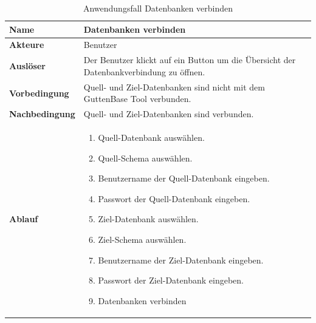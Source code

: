 	\begin{table}[H]
		\centering
		\begin{tabular}{ |p{4cm}|p{8cm}| }
			\hline
			\textbf{Name} & Datenbanken verbinden  \\
			\hline
			\textbf{Akteure} & Benutzer  \\
			\hline
			\textbf{Auslöser} & Der Benutzer klickt auf ein Button um die Übersicht der Datenbankverbindung zu öffnen. \\
			\hline
			\textbf{Vorbedingung} &  Quell- und Ziel-Datenbanken sind nicht mit dem GuttenBase Tool verbunden.\\
			\hline
			\textbf{Nachbedingung} & Quell- und Ziel-Datenbanken sind verbunden.  \\
			\hline
			\textbf{Ablauf} &  
			\begin{enumerate}
				\item Quell-Datenbank auswählen.
				\item Quell-Schema auswählen.
				\item Benutzername der Quell-Datenbank eingeben.
				\item Passwort der Quell-Datenbank eingeben.
				\item Ziel-Datenbank auswählen.
				\item Ziel-Schema auswählen.
				\item Benutzername der Ziel-Datenbank eingeben.
				\item Passwort der Ziel-Datenbank eingeben.
				\item Datenbanken verbinden
			\end{enumerate}  \\
			\hline
			
		\end{tabular}
		\caption{Anwendungsfall Datenbanken verbinden}
		\label{table:db-verbinden}
	\end{table}
		
		
